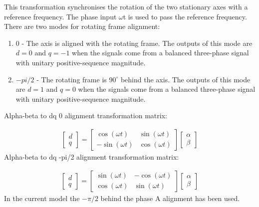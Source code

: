 \documentclass[a4paper,12pt]{iitmdiss}
\begin{document}
 This transformation synchronises the rotation of the two stationary axes with a reference frequency. The phase input $\omega$t is used to pass the reference frequency. There are two modes for rotating frame alignment:
\begin{enumerate}
    \item $0$ - The axis is aligned with the rotating frame. The outputs of this mode are $d = 0$ and $q = -1$ when the signals come from a balanced three-phase signal with unitary positive-sequence magnitude.
    \item $-pi/2$ - The rotating frame is $90^{\circ}$ behind the axis. The outputs of this mode are $d = 1$ and $q = 0$ when the signals come from a balanced three-phase signal with unitary positive-sequence magnitude.

\end{enumerate}

Alpha-beta to dq 0 alignment transformation matrix:

\begin{gather}
 \begin{bmatrix} d \\ q  \end{bmatrix}
 =
 \begin{bmatrix} \cos(\omega t) & \sin(\omega t) \\ -\sin(\omega t) & \cos(\omega t)  \end{bmatrix}
 \begin{bmatrix} \alpha \\ \beta  \end{bmatrix}
\end{gather}
\quad
Alpha-beta to dq -pi/2 alignment transformation matrix:

\begin{gather}
 \begin{bmatrix} d \\ q  \end{bmatrix}
 =
 \begin{bmatrix} \sin(\omega t) & -\cos(\omega t) \\ \cos(\omega t) & \sin(\omega t)  \end{bmatrix}
 \begin{bmatrix} \alpha \\ \beta  \end{bmatrix}
\end{gather}
\quad
In the current model the $-\pi /2$ behind the phase A alignment has been used.
\end{document}
